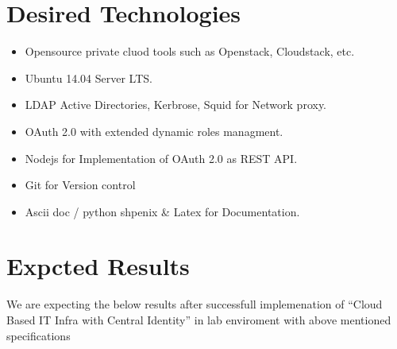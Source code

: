 \documentclass[12pt]{report}
\begin{document}
\section{Desired Technologies}

	\begin{itemize}
		\item Opensource private cluod tools such as Openstack, Cloudstack, etc.
		\item Ubuntu 14.04 Server LTS.
		\item LDAP Active Directories, Kerbrose, Squid for Network proxy.
		\item OAuth 2.0 with extended dynamic roles managment.
		\item Nodejs for Implementation of OAuth 2.0 as REST API.
		\item Git for Version control 
		\item Ascii doc / python shpenix \& Latex for Documentation.
	\end{itemize}
	
\section{Expcted Results}

	We are expecting the below results after successfull implemenation of ``Cloud Based IT Infra with Central Identity'' in lab enviroment with above mentioned specifications
\end{document}
